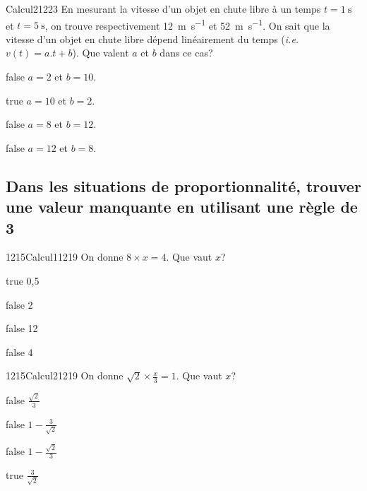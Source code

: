 \documentclass[11pt]{article}
\begin{document}
            \begin{question}{27}{Calcul}{2}{1223}
                En mesurant la vitesse d'un objet en chute libre à un temps $t=\SI{1}{\second}$ et $t=\SI{5}{\second}$, on trouve respectivement \SI{12}{\meter\per\second} et \SI{52}{\meter\per\second}. On sait que la vitesse d'un objet en chute libre dépend linéairement du temps (\textit{i.e.} $v(t) = a.t+b$). Que valent $a$ et $b$ dans ce cas?
            \end{question}

            \begin{reponses}
                \item[false] $a=2$ et $b=10$.
                \item[true] $a=10$ et $b=2$.
                \item[false] $a=8$ et $b=12$.
                \item[false] $a=12$ et $b=8$.
            \end{reponses}

        \subsection{Dans les situations de proportionnalité, trouver une valeur manquante en utilisant une règle de 3}

            \begin{question}{1215}{Calcul}{1}{1219}
                On donne $8\times x=4$. Que vaut $x$?
            \end{question}

            \begin{reponses}
                \item[true] 0,5
                \item[false] 2
                \item[false] 12
                \item[false] 4
            \end{reponses}
        
        	\begin{question}{1215}{Calcul}{2}{1219}
				On donne $\sqrt{2} \times \frac{x}{3}=1$. Que vaut $x$?
            \end{question}

            \begin{reponses}
            	\item[false] $\frac{\sqrt{2}}{3}$
            	\item[false] $1-\frac{3}{\sqrt{2}}$
                \item[false] $1-\frac{\sqrt{2}}{3}$
                \item[true] $\frac{3}{\sqrt{2}}$
            \end{reponses}
\end{document}

